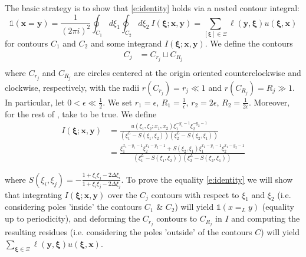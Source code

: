 \documentclass[a4paper,11pt]{article}
\theoremstyle{definition}
\begin{document}
The basic strategy is to show that \eqref{e:identity} holds via a nested contour integral:
\begin{equation}
    \mathds{1}(\mathbf{x} = \mathbf{y}) =\frac{1}{(2\pi i)^2}\oint_{C_1}d\xi_1 \oint_{C_2} d\xi_2 \ I(\boldsymbol{\xi};\mathbf{x},\mathbf{y}) =  \sum_{[\boldsymbol{\xi}] \in \Xi}  \ell(\mathbf{y}, \boldsymbol{\xi}) u(\boldsymbol{\xi}, \mathbf{x})
\end{equation}
for contours $C_1$ and $C_2$ and some integrand $I(\boldsymbol{\xi}; \boldsymbol{x}, \boldsymbol{y})$. We define the contours
\begin{equation}\label{e:contour}
\begin{split}
    C_j &= C_{r_j} \sqcup C_{R_j} \\
\end{split}
\end{equation}
where $C_{r_j}$ and $C_{R_j}$ are circles centered at the origin oriented counterclockwise and clockwise, respectively, with the radii $r(C_{r_j})=r_j \ll1$ and $r(C_{R_j})=R_j \gg1$. In particular, let $0<\epsilon \ll \frac12$. We set $r_1=\epsilon$, $R_1=\frac1\epsilon$, $r_2=2\epsilon$, $R_2=\frac{1}{2\epsilon}$. Moreover, for the rest of , take  to be true. We define
\begin{equation}\label{e:integrand}
\begin{split}
    I(\boldsymbol{\xi};\mathbf{x},\mathbf{y})&= \frac{u(\xi_1,\xi_2;x_1,x_2)\xi_1^{-y_1-1}\xi_2^{-y_2-1}}{\left(\xi_1^L - S(\xi_1,\xi_2) \right)\left(\xi_2^L - S(\xi_2,\xi_1) \right)} \\
    &=  \frac{\xi_1^{x_1-y_1-1}\xi_2^{x_2-y_2-1}+S(\xi_2,\xi_1)\xi_1^{x_2-y_1-1}\xi_2^{x_1-y_2-1}}{\left(\xi_1^L - S(\xi_1,\xi_2) \right)\left(\xi_2^L - S(\xi_2,\xi_1) \right)}
\end{split}
\end{equation}

where $S(\xi_i,\xi_j) = -\frac{1+\xi_i\xi_j-2\Delta\xi_i}{1+\xi_i\xi_j-2\Delta\xi_j}$. To prove the equality \eqref{e:identity} we will show that integrating $I(\boldsymbol{\xi};\mathbf{x},\mathbf{y})$ over the $C_j$ contours with respect to $\xi_1$ and $\xi_2$ (i.e. considering poles 'inside' the contours $C_1$ \& $C_2$) will yield $\mathds{1}(x=_L y)$ (equality up to periodicity), and deforming the $C_{r_j}$ contours to $C_{R_j}$ in $I$ and computing the resulting residues (i.e. considering the poles 'outside' of the contours $C$) will yield $\sum_{\boldsymbol{\xi}\in\Xi}\ell(\mathbf{y},\boldsymbol\xi)u(\boldsymbol{\xi},\mathbf{x})$. 
\end{document}
